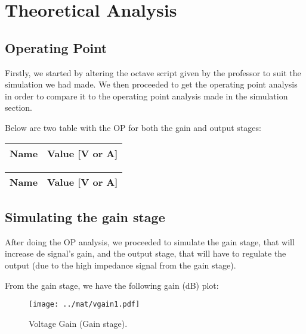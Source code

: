 \section{Theoretical Analysis}
\label{sec:analysis}

\subsection{Operating Point}
Firstly, we started by altering the octave script given by the professor to suit the simulation we had made. We then proceeded to get the operating point analysis in order to compare it to the operating point analysis made in the simulation section.\par
Below are two table with the OP for both the gain and output stages:

\begin{center}
  \begin{tabular}{ | c | c | }
    \hline    
    {\bf Name} & {\bf Value [V or A]} \\ \hline
    
    \hline
  \end{tabular}
\end{center}

\begin{center}
  \begin{tabular}{ | c | c | }
    \hline    
    {\bf Name} & {\bf Value [V or A]} \\ \hline
    
    \hline
  \end{tabular}
\end{center}

\subsection{Simulating the gain stage}
After doing the OP analysis, we proceeded to simulate the gain stage, that will increase de signal's gain, and the output stage, that will have to regulate the output (due to the high impedance signal from the gain stage).\par
From the gain stage, we have the following gain (dB) plot:\par

\begin{figure}[H] \centering
\texttt{[image: ../mat/vgain1.pdf]}
\caption{Voltage Gain (Gain stage).}
\label{fig:vgain}
\end{figure}


